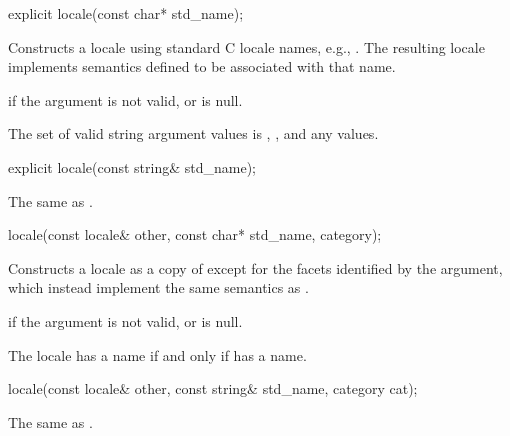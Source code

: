 %
\begin{itemdecl}
explicit locale(const char* std_name);
\end{itemdecl}

\begin{itemdescr}
\pnum
\effects
Constructs a locale using standard C locale names, e.g., .
The resulting locale implements semantics defined to be associated
with that name.

\pnum
\throws
{}
if the argument is not valid, or is null.

\pnum
\remarks
The set of valid string argument values is , ,
and any  values.
\end{itemdescr}

%
\begin{itemdecl}
explicit locale(const string& std_name);
\end{itemdecl}

\begin{itemdescr}
\pnum
\effects The same as .
\end{itemdescr}

%
\begin{itemdecl}
locale(const locale& other, const char* std_name, category);
\end{itemdecl}

\begin{itemdescr}
\pnum
\effects
Constructs a locale as a copy of
except for the facets identified by the
argument, which instead implement the same semantics as
.

\pnum
\throws
{}
if the argument is not valid, or is null.

\pnum
\remarks
The locale has a name if and only if
has a name.
\end{itemdescr}

%
\begin{itemdecl}
locale(const locale& other, const string& std_name, category cat);
\end{itemdecl}

\begin{itemdescr}
\pnum
\effects The same as .
\end{itemdescr}

